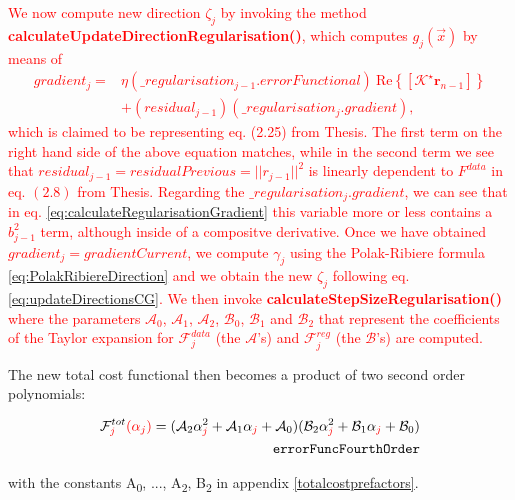 \documentclass[10pt,a4paper]{article}
\newcommand{\real}[1]{\text{Re} \left\{ #1 \right\}}
\begin{document}
\textcolor{red}{
We now compute new direction $\zeta_j$ by invoking the method \textbf{calculateUpdateDirectionRegularisation()}, which computes $g_j(\vec{x})$ by means of
\begin{align}
gradient_j =& \eta  (\_regularisation_{j-1}.errorFunctional) \ \real{[\mathcal{K}^\star\mathbf{r}_{n-1}]} \\
 &+ (residual_{j-1})( \_regularisation_j.gradient),
\end{align}
which is claimed to be representing eq. (2.25) from Thesis. 
The first term on the right hand side of the above equation matches, 
while in the second term we see that $residual_{j-1} = residualPrevious = ||r_{j-1}||^2$ is linearly dependent to $F ^{data}$ in eq. $(2.8)$ from Thesis. 
Regarding the $ \_regularisation_j.gradient$, we can see that in eq. \eqref{eq:calculateRegularisationGradient} this variable more or less contains a $b_{j-1}^2$ term, although inside of a compositve derivative.
\newline
Once we have obtained $gradient_j= gradientCurrent$, we compute $\gamma_j$ using the Polak-Ribiere formula \eqref{eq:PolakRibiereDirection} and we obtain the new $\zeta_j$ following eq. \eqref{eq:updateDirectionsCG}.
}
\newline
\textcolor{red}{
We then invoke \textbf{calculateStepSizeRegularisation()} where the parameters $\mathcal{A}_0$, $\mathcal{A}_1$, $\mathcal{A}_2$, $\mathcal{B}_0$, $\mathcal{B}_1$ and $\mathcal{B}_2$ that represent the coefficients of the Taylor expansion for $\mathcal{F}^{data}_j$ (the $\mathcal{A}$'s) and $\mathcal{F}^{reg}_j$ (the $\mathcal{B}$'s) are computed.
}

The new total cost functional then becomes a product of two second order polynomials:

\begin{align} \label{eq:errorFuncFourthOrder} \mathcal{F}^{tot}_{\textcolor{red}{j}} \textcolor{red}{(\alpha_j)} =
(\mathcal{A}_2\alpha^{2}_{\textcolor{red}{j}} + \mathcal{A}_1\alpha_{\textcolor{red}{j}}
+\mathcal{A}_0)(\mathcal{B}_2\alpha^{2}_{\textcolor{red}{j}} + \mathcal{B}_1\alpha_{\textcolor{red}{j}} +
\mathcal{B}_0)\\
\tag*{\texttt{errorFuncFourthOrder}}
\end{align}

with the constants A\textsubscript{0}, ..., A\textsubscript{2}, B\textsubscript{2} in appendix \ref{totalcostprefactors}.
\end{document}
